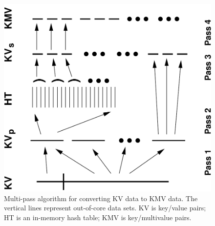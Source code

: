 \begin{figure}
\includegraphics[width=\textwidth,angle=-90]{fig_collate2.pdf}
\caption{Multi-pass algorithm for converting KV data to KMV data.  The
vertical lines represent out-of-core data sets.  KV is key/value
pairs; HT is an in-memory hash table; KMV is key/multivalue pairs.}
\label{fig:collate}
\end{figure}

